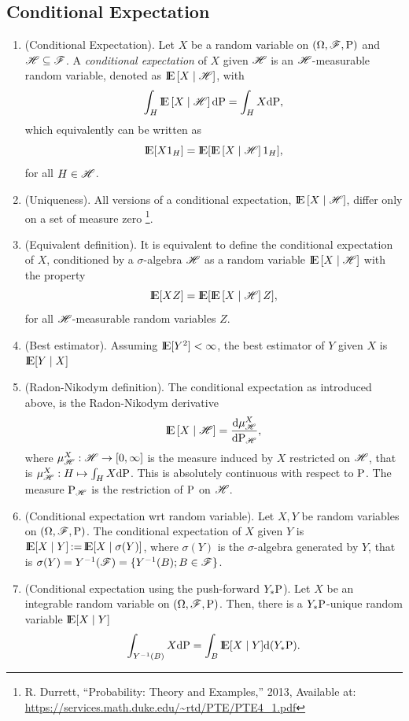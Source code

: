 \documentclass[a4paper,10pt]{article}
\newcommand{\ce}[1]{\E\left[#1 {}\mid{} \HH \right]}
\begin{document}
\subsection{Conditional Expectation}
\begin{enumerate}
 \item (Conditional Expectation). Let $X$ be a random variable on $(\Omega,\mathscr{F},\mathrm{P})$ and $\mathscr{H}\subseteq \mathscr{F}$.
       A \textit{conditional expectation} of $X$ given $\mathscr{H}$ is an $\mathscr{H}$-measurable 
       random variable, denoted as $\ce{X}$, with
       \[
        \int_H \ce{X} \d\prob = \int_H X\d\prob,
       \]
       which equivalently can be written as
       \[
        \E[X 1_H] = \E[\ce{X}1_H],
       \]
       for all $H\in\mathscr{H}$.
 \item (Uniqueness). All versions of a conditional expectation, $\ce{X}$, differ only on a 
       set of measure zero%
       \footnote{R. Durrett, ``Probability: Theory and Examples,'' 2013, Available at: \url{https://services.math.duke.edu/~rtd/PTE/PTE4_1.pdf}}.
 \item (Equivalent definition). It is equivalent to define the conditional expectation of $X$, 
       conditioned by a $\sigma$-algebra $\mathscr{H}$ as a random variable $\ce{X}$ with the property
       \[
        \E[X Z] = \E[\ce{X}Z],
       \]
       for all $\mathscr{H}$-measurable random variables $Z$.
 \item (Best estimator). Assuming $\E[Y^2]<\infty$, the best estimator of $Y$ given $X$ is $\E[Y{}\mid{}X]$      
 \item (Radon-Nikodym definition). The conditional expectation as introduced above, is the Radon-Nikodym
       derivative
       \[
          \ce{X} = \frac{\d \mu^X_{\HH}}{\d \prob_{\HH}},
       \]
      where $\mu^X_{\mathscr{H}}:\mathscr{H}\to [0,\infty]$ is the measure induced by $X$
      restricted on $\mathscr{H}$, that is $\mu^X_{\mathscr{H}}:H\mapsto \int_H X\mathrm{d}\mathrm{P}$.
      This is absolutely continuous with respect to $\mathrm{P}$. The measure $\mathrm{P}_{\mathscr{H}}$
      is the restriction of $\mathrm{P}$ on $\mathscr{H}$. 
      
 \item (Conditional expectation wrt random variable). Let $X,Y$ be random variables on $(\Omega,\mathscr{F},\mathrm{P})$.
       The conditional expectation of $X$ given $Y$ is $\E[X\mid Y]\dfn \E[X\mid \sigma(Y)]$,
       where $\sigma(Y)$ is the $\sigma$-algebra generated by $Y$, that is 
       $\sigma(Y) = Y^{-1}(\mathscr{F}) = \{Y^{-1}(B); B\in\mathscr{F}\}$.
       
 \item (Conditional expectation using the push-forward $Y_*\mathrm{P}$). 
       Let $X$ be an integrable random variable on $(\Omega,\mathscr{F},\mathrm{P})$. Then, there is a $Y_*\mathrm{P}$-unique 
       random variable $\E[X\mid Y]$
       \[
        \int_{Y^{-1}(B)} X\d \prob = \int_B \E[X{}\mid{}Y]\d(Y_*\prob).
       \]


\end{enumerate}
\end{document}
